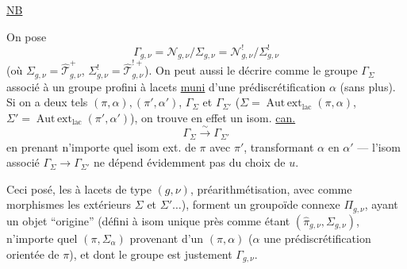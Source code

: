 
\uline{NB}

On pose 
\[
\Gamma_{g,\nu}=\mathcal N_{g,\nu}/\Sigma_{g,\nu}
=\mathcal N^{!}_{g,\nu}/\Sigma^{!}_{g,\nu}
\]
(où $\Sigma_{g,\nu}=\widehat{\mathcal T}^{+}_{g,\nu}$,
$\Sigma^{!}_{g,\nu}=\widehat{\mathcal T}^{!+}_{g,\nu}$).
On peut aussi le décrire comme le groupe $\Gamma_{\Sigma}$ associé à un
groupe  profini à lacets \inserted{$\pi$}
\uline{muni} d'une prédiscrétification 
$\alpha$ (sans plus). Si on a deux tels 
$(\pi,\alpha),(\pi',\alpha')$,  $\Gamma_{\Sigma}$ et
$\Gamma_{\Sigma'}$ ($\Sigma=\operatorname{Aut\,ext}_{\mathrm{lac}}(\pi,\alpha)$,
$\Sigma'=\operatorname{Aut\,ext}_{\mathrm{lac}}(\pi',\alpha')$), on trouve en effet un
isom. \uline{can.}
\[
\Gamma_{\Sigma}\xrightarrow{\sim}\Gamma_{\Sigma'}
\]
en prenant n'importe quel isom ext.  de $\pi$ avec $\pi'$,
transformant $\alpha$ en $\alpha'$ --- l'isom associé
$\Gamma_{\Sigma}\longrightarrow\Gamma_{\Sigma'}$ ne dépend évidemment pas du choix de
$u$.

Ceci posé, les 
  à lacets de type $(g,\nu)$,
 préarithmétisation,
avec comme morphismes les   extérieurs
 $\Sigma$ et $\Sigma'\ldots$),
forment un groupoïde connexe $\Pi_{g,\nu}$, ayant un objet ``origine''
(défini à isom unique près comme étant $(\widehat{\pi}_{g,\nu},\Sigma_{g,\nu})$,
 n'importe quel $(\pi,\Sigma_{\alpha})$ provenant d'un
$(\pi,\alpha)$ ($\alpha$ une prédiscrétification orientée de $\pi$),
et dont le groupe   est justement $\Gamma_{g,\nu}$.


